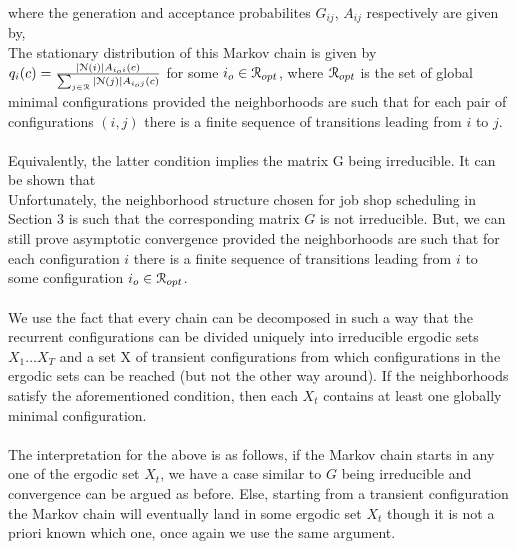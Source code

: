\documentclass[letterpaper,english,10pt]{article}
\begin{document}
where the generation and acceptance probabilites $G_{ij}$, $A_{ij}$ respectively are given by,
\\
The stationary distribution of this Markov chain is given by $q_i(c) = \frac{|\mathcal{N}(i)|A_{i_oi}(c)}{\sum_{j \in \mathcal{R}}|\mathcal{N}(j)|A_{i_oj}(c)}$ for some $i_o \in \mathcal{R}_{opt}$, where $\mathcal{R}_{opt}$ is the set of global minimal configurations provided the neighborhoods are such that for each pair of configurations $(i,j)$ there is a finite sequence of transitions leading from $i$ to $j$.\\
\\
Equivalently, the latter condition implies the matrix G being irreducible. It can be shown that 
\\
Unfortunately, the neighborhood structure chosen for job shop scheduling in Section 3 is such that the corresponding matrix $G$ is not irreducible. But, we can still prove asymptotic convergence provided the neighborhoods are such that for each configuration $i$ there is a finite sequence of transitions leading from $i$ to some configuration $i_o \in \mathcal{R}_{opt}$.\\
\\
We use the fact that every chain can be decomposed in such a way that the recurrent configurations can be divided uniquely into irreducible ergodic sets $X_1 \ldots X_T$ and a set X of transient configurations from which configurations in the ergodic sets can be reached (but not the other way around). If the neighborhoods satisfy the aforementioned condition, then each $X_t$ contains at least one globally minimal configuration.\\
\\
The interpretation for the above is as follows, if the Markov chain starts in any one of the ergodic set $X_t$, we have a case similar to $G$ being irreducible and convergence can be argued as before. Else, starting from a transient configuration the Markov chain will eventually land in some ergodic set $X_t$ though it is not a priori known which one, once again we use the same argument.   
\end{document}
